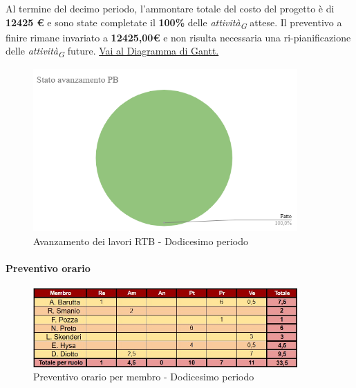 Al termine del decimo periodo, l'ammontare totale del costo del progetto è di \textbf{12425 \euro} e sono state completate il \textbf{100\%} delle \textit{attività}\textsubscript{\textit{G}} attese.
Il preventivo a finire rimane invariato a \textbf{12425,00\euro} e non risulta necessaria una ri-pianificazione delle \textit{attività}\textsubscript{\textit{G}} future.
\href{https://github.com/orgs/ByteOps-swe/projects/3/views/1?sortedBy%5Bdirection%5D=asc&sortedBy%5BcolumnId%5D=64182560}{Vai al Diagramma di Gantt.}

\begin{figure}[H]
    \centering
    \begin{minipage}[b]{0.70\textwidth}
        \centering
        \includegraphics[width=0.9\textwidth]{../Images/avanzamento12Periodo.png}
        \caption{Avanzamento dei lavori RTB - Dodicesimo periodo}
        \label{fig:Avanzamento_RTB_12}
    \end{minipage}
\end{figure}

\paragraph{Preventivo orario}

\begin{figure}[H] 
    \centering
    \includegraphics[width=0.9\textwidth]{../Images/preventivoOrario12Periodo.jpeg}
    \caption{Preventivo orario per membro - Dodicesimo periodo}
    \label{fig:Preventivo_orario_12}
\end{figure}

